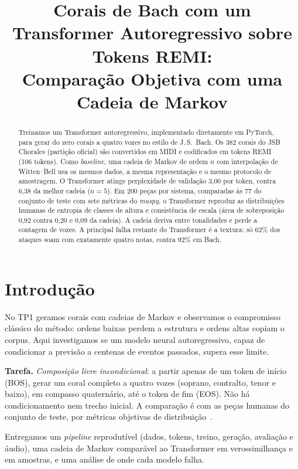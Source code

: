\documentclass{article}
\title{Corais de Bach com um Transformer Autoregressivo sobre Tokens REMI: \\ Comparação Objetiva com uma Cadeia de Markov}
\begin{document}
\maketitle

\begin{abstract}
Treinamos um Transformer autoregressivo, implementado diretamente em PyTorch, para gerar do zero corais a quatro vozes no estilo de J.\,S.~Bach. Os 382 corais do JSB Chorales (partição oficial) são convertidos em MIDI e codificados em tokens REMI (106 tokens). Como \textit{baseline}, uma cadeia de Markov de ordem $n$ com interpolação de Witten--Bell usa os mesmos dados, a mesma representação e o mesmo protocolo de amostragem. O Transformer atinge perplexidade de validação 3{,}00 por token, contra 6{,}38 da melhor cadeia ($n=5$). Em 200 peças por sistema, comparadas às 77 do conjunto de teste com sete métricas do \textit{muspy}, o Transformer reproduz as distribuições humanas de entropia de classes de altura e consistência de escala (área de sobreposição 0{,}92 contra 0{,}20 e 0{,}09 da cadeia). A cadeia deriva entre tonalidades e perde a contagem de vozes. A principal falha restante do Transformer é a textura: só 62\% dos ataques soam com exatamente quatro notas, contra 92\% em Bach.
\end{abstract}

\section{Introdução}\label{sec:intro}
No TP1 geramos corais com cadeias de Markov e observamos o compromisso clássico do método: ordens baixas perdem a estrutura e ordens altas copiam o corpus. Aqui investigamos se um modelo neural autoregressivo, capaz de condicionar a previsão a centenas de eventos passados, supera esse limite.

\textbf{Tarefa.} \emph{Composição livre incondicional}: a partir apenas de um token de início (BOS), gerar um coral completo a quatro vozes (soprano, contralto, tenor e baixo), em compasso quaternário, até o token de fim (EOS). Não há condicionamento nem trecho inicial. A comparação é com as peças humanas do conjunto de teste, por métricas objetivas de distribuição~\cite{yang2020evaluation}.

Entregamos um \textit{pipeline} reprodutível (dados, tokens, treino, geração, avaliação e áudio), uma cadeia de Markov comparável ao Transformer em verossimilhança e em amostras, e uma análise de onde cada modelo falha.
\end{document}
